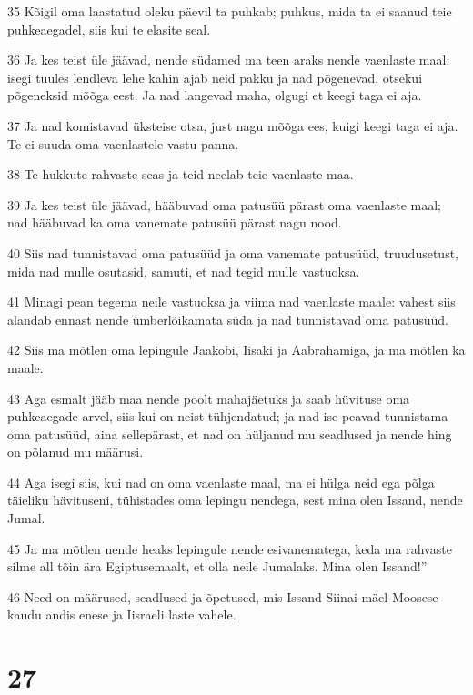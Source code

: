 \par 35 Kõigil oma laastatud oleku päevil ta puhkab; puhkus, mida ta ei saanud teie puhkeaegadel, siis kui te elasite seal.
\par 36 Ja kes teist üle jäävad, nende südamed ma teen araks nende vaenlaste maal: isegi tuules lendleva lehe kahin ajab neid pakku ja nad põgenevad, otsekui põgeneksid mõõga eest. Ja nad langevad maha, olgugi et keegi taga ei aja.
\par 37 Ja nad komistavad üksteise otsa, just nagu mõõga ees, kuigi keegi taga ei aja. Te ei suuda oma vaenlastele vastu panna.
\par 38 Te hukkute rahvaste seas ja teid neelab teie vaenlaste maa.
\par 39 Ja kes teist üle jäävad, hääbuvad oma patusüü pärast oma vaenlaste maal; nad hääbuvad ka oma vanemate patusüü pärast nagu nood.
\par 40 Siis nad tunnistavad oma patusüüd ja oma vanemate patusüüd, truudusetust, mida nad mulle osutasid, samuti, et nad tegid mulle vastuoksa.
\par 41 Minagi pean tegema neile vastuoksa ja viima nad vaenlaste maale: vahest siis alandab ennast nende ümberlõikamata süda ja nad tunnistavad oma patusüüd.
\par 42 Siis ma mõtlen oma lepingule Jaakobi, Iisaki ja Aabrahamiga, ja ma mõtlen ka maale.
\par 43 Aga esmalt jääb maa nende poolt mahajäetuks ja saab hüvituse oma puhkeaegade arvel, siis kui on neist tühjendatud; ja nad ise peavad tunnistama oma patusüüd, aina sellepärast, et nad on hüljanud mu seadlused ja nende hing on põlanud mu määrusi.
\par 44 Aga isegi siis, kui nad on oma vaenlaste maal, ma ei hülga neid ega põlga täieliku hävituseni, tühistades oma lepingu nendega, sest mina olen Issand, nende Jumal.
\par 45 Ja ma mõtlen nende heaks lepingule nende esivanematega, keda ma rahvaste silme all tõin ära Egiptusemaalt, et olla neile Jumalaks. Mina olen Issand!”
\par 46 Need on määrused, seadlused ja õpetused, mis Issand Siinai mäel Moosese kaudu andis enese ja Iisraeli laste vahele.

\chapter{27}

